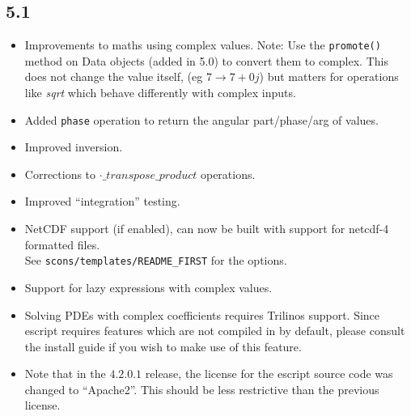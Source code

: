 \subsection*{5.1}
\begin{itemize}
  \item Improvements to maths using complex values.
	  Note: Use the \texttt{promote()} method on Data objects (added in 5.0) to convert them to complex. 
This does not change the value itself, (eg $7 \rightarrow 7+0j$) but matters for operations like \emph{sqrt} which behave differently with complex inputs.
  \item Added \texttt{phase} operation to return the angular part/phase/arg of values.
  \item Improved inversion.
  \item Corrections to $\cdot\_transpose\_product$ operations.
  \item Improved ``integration'' testing.
  \item NetCDF support (if enabled), can now be built with support for netcdf-4 formatted files.\\
  See \texttt{scons/templates/README_FIRST} for the options.
  \item Support for lazy expressions with complex values.
  \item Solving PDEs with complex coefficients requires Trilinos support.
  Since escript requires features which are not 
  compiled in by default, please consult the install guide if you wish to make use of
  this feature.
  \item Note that in the $4.2.0.1$ release, the license for the escript source code was changed to ``Apache2''. 
  This should be less restrictive than the previous license.  
\end{itemize}

